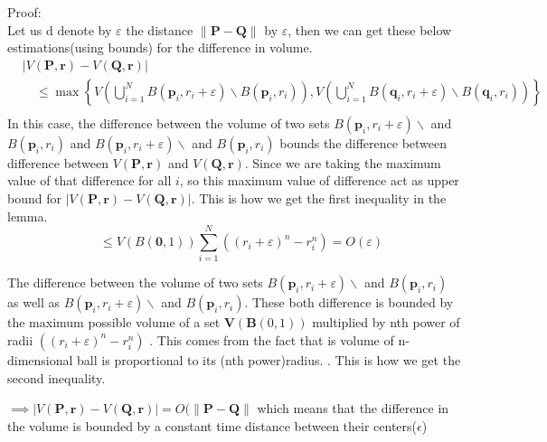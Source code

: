 Proof:\\ Let us d denote by $\varepsilon$ the distance $\|\mathbf{P}-\mathbf{Q}\|$ by $\varepsilon$, then we can get these below estimations(using bounds) for the difference in volume.
$$
\begin{aligned}
& |V(\mathbf{P}, \mathbf{r})-V(\mathbf{Q}, \mathbf{r})| \\
& \quad \leq \max \left\{V\left(\bigcup_{i=1}^{N} B\left(\mathbf{p}_{i}, r_{i}+\varepsilon\right) \backslash B\left(\mathbf{p}_{i}, r_{i}\right)\right), V\left(\bigcup_{i=1}^{N} B\left(\mathbf{q}_{i}, r_{i}+\varepsilon\right) \backslash B\left(\mathbf{q}_{i}, r_{i}\right)\right)\right\} \\
\end{aligned}
$$
In this case, the difference between the volume of two sets $B\left(\mathbf{p}_{i}, r_{i}+\varepsilon\right) \backslash$ and $ B\left(\mathbf{p}_{i}, r_{i}\right)$ and $B\left(\mathbf{p}_{i}, r_{i}+\varepsilon\right) \backslash$ and $ B\left(\mathbf{p}_{i}, r_{i}\right)$ bounds the difference between difference between $V(\mathbf{P}, \mathbf{r})$ and $V(\mathbf{Q}, \mathbf{r})$. Since we are taking the maximum value of that difference for all $i$, so this maximum value of difference act as upper bound for $|V(\mathbf{P}, \mathbf{r})-V(\mathbf{Q}, \mathbf{r})|$. This is how we get the first inequality in the lemma.\\
$$\quad \leq V(B(\mathbf{0}, 1)) \sum_{i=1}^{N}\left(\left(r_{i}+\varepsilon\right)^{n}-r_{i}^{n}\right)=O(\varepsilon)$$ 

The difference between the volume of two sets $B\left(\mathbf{p}_{i}, r_{i}+\varepsilon\right) \backslash$ and $ B\left(\mathbf{p}_{i}, r_{i}\right)$ as well as  $B\left(\mathbf{p}_{i}, r_{i}+\varepsilon\right) \backslash$ and $ B\left(\mathbf{p}_{i}, r_{i}\right)$. These both difference is bounded by the maximum possible volume of a set $\boldsymbol{V}(\boldsymbol{B}(0,1))$ multiplied by nth power of radii $\left(\left(r_{i}+\varepsilon\right)^{n}-r_{i}^{n}\right)$ .  This comes from the fact that is volume of n-dimensional ball is proportional to its (nth power)radius. . This is how we get the second inequality.

$\implies |V(\mathbf{P}, \mathbf{r})-V(\mathbf{Q}, \mathbf{r})|=O(\|\mathbf{P}-\mathbf{Q}\| $ which means that the difference in the volume is bounded by a constant time distance between their centers($\epsilon$)\\



